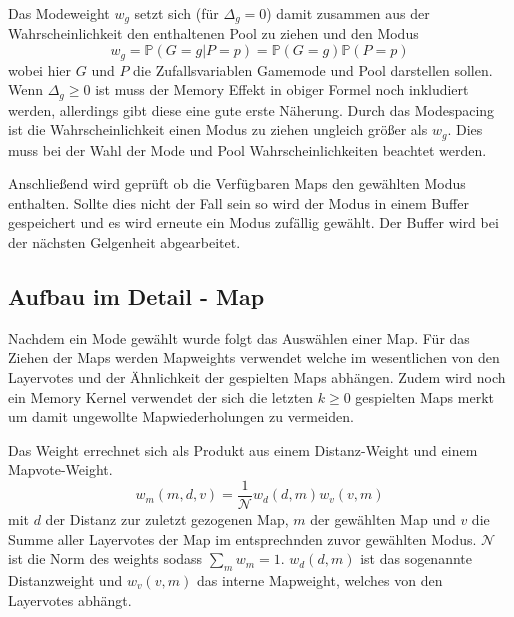         Das Modeweight $w_g$ setzt sich (für $\Delta_g=0$) damit zusammen aus der Wahrscheinlichkeit den enthaltenen Pool zu ziehen und den Modus
        \begin{equation}
            w_g = \mathbb{P}(G=g|P=p) = \mathbb{P}(G=g)\mathbb{P}(P=p)
        \end{equation}
        wobei hier $G$ und $P$ die Zufallsvariablen \glqq{}Gamemode\grqq{} und \glqq{}Pool\grqq{} darstellen sollen.
        Wenn $\Delta_g\geq0$ ist muss der Memory Effekt in obiger Formel noch inkludiert werden, allerdings gibt diese eine gute erste Näherung.
        Durch das Modespacing ist die Wahrscheinlichkeit einen Modus zu ziehen ungleich größer als $w_g$.
        Dies muss bei der Wahl der Mode und Pool Wahrscheinlichkeiten beachtet werden.

        Anschließend wird geprüft ob die Verfügbaren Maps den gewählten Modus enthalten. Sollte dies nicht der Fall sein so wird der Modus in einem Buffer gespeichert und es wird erneute ein Modus zufällig gewählt.
        Der Buffer wird bei der nächsten Gelgenheit abgearbeitet.
    \subsection{Aufbau im Detail - Map}
    \label{sub:AufbauImDetail-Map}
        Nachdem ein Mode gewählt wurde folgt das Auswählen einer Map.
        Für das Ziehen der Maps werden Mapweights verwendet welche im wesentlichen von den Layervotes und der \glqq{}Ähnlichkeit\grqq{} der gespielten Maps abhängen.
        Zudem wird noch ein Memory Kernel verwendet der sich die letzten $k\geq 0$ gespielten Maps merkt um damit ungewollte Mapwiederholungen zu vermeiden.

        Das Weight errechnet sich als Produkt aus einem \glqq{}Distanz-Weight\grqq{} und einem \glqq{}Mapvote-Weight\grqq{}.
        \begin{equation}
            w_m(m,d,v) = \frac{1}{\mathcal{N}}w_d(d,m)w_v(v,m)
        \end{equation}
        mit $d$ der Distanz zur zuletzt gezogenen Map, $m$ der gewählten Map und $v$ die Summe aller Layervotes der Map im entsprechnden zuvor gewählten Modus.
        $\mathcal{N}$ ist die Norm des weights sodass $\sum_m w_m = 1$.
        $w_d(d,m)$ ist das sogenannte \glqq Distanzweight \grqq und
        $w_v(v,m)$ das interne Mapweight, welches von den Layervotes abhängt.

